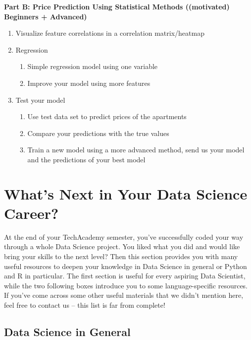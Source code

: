 \documentclass[
  11pt,
]{article}
\begin{document}
\textbf{Part B: Price Prediction Using Statistical Methods ((motivated) Beginners + Advanced)}

\begin{enumerate}
\def\labelenumi{\arabic{enumi}.}
\item
  Visualize feature correlations in a correlation matrix/heatmap
\item
  Regression

  \begin{enumerate}
  \def\labelenumii{\alph{enumii}.}
  \item
    Simple regression model using one variable
  \item
    Improve your model using more features
  \end{enumerate}
\item
  Test your model

  \begin{enumerate}
  \def\labelenumii{\alph{enumii}.}
  \item
    Use test data set to predict prices of the apartments
  \item
    Compare your predictions with the true values
  \item
    Train a new model using a more advanced method, send us your model and the predictions of your best model
  \end{enumerate}
\end{enumerate}

\newpage

\hypertarget{whats-next-in-your-data-science-career}{%
\section{What's Next in Your Data Science Career?}\label{whats-next-in-your-data-science-career}}

At the end of your TechAcademy semester, you've successfully coded your way through a whole Data Science project. You liked what you did and would like bring your skills to the next level? Then this section provides you with many useful resources to deepen your knowledge in Data Science in general or Python and R in particular. The first section is useful for every aspiring Data Scientist, while the two following boxes introduce you to some language-specific resources. If you've come across some other useful materials that we didn't mention here, feel free to contact us -- this list is far from complete!

\hypertarget{data-science-in-general}{%
\subsection{Data Science in General}\label{data-science-in-general}}
\end{document}

